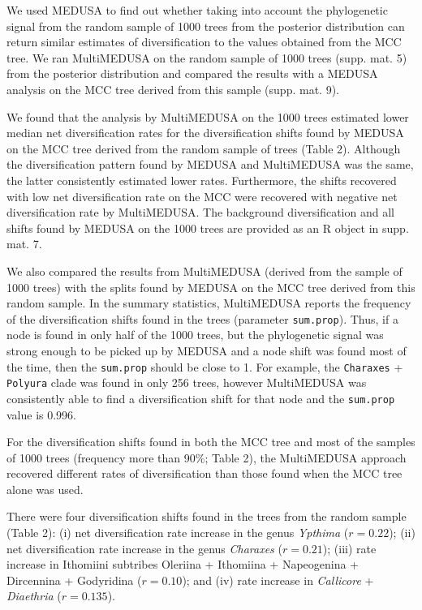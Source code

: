 \documentclass[10pt]{article}
\begin{document}
We used MEDUSA to find out whether taking into account the phylogenetic
signal from the random sample of 1000 trees from the posterior
distribution can return similar estimates of diversification to the
values obtained from the MCC tree. We ran MultiMEDUSA on the random
sample of 1000 trees (supp. mat. 5) from the posterior distribution and
compared the results with a MEDUSA analysis on the MCC tree derived from
this sample (supp. mat. 9).

We found that the analysis by MultiMEDUSA on the 1000 trees estimated
lower median net diversification rates for the diversification shifts
found by MEDUSA on the MCC tree derived from the random sample of trees
(Table 2). Although the diversification pattern found by MEDUSA and
MultiMEDUSA was the same, the latter consistently estimated lower rates.
Furthermore, the shifts recovered with low net diversification rate on
the MCC were recovered with negative net diversification rate by
MultiMEDUSA. The background diversification and all shifts found by
MEDUSA on the 1000 trees are provided as an R object in supp. mat. 7.

We also compared the results from MultiMEDUSA (derived from the sample
of 1000 trees) with the splits found by MEDUSA on the MCC tree derived
from this random sample. In the summary statistics, MultiMEDUSA reports
the frequency of the diversification shifts found in the trees
(parameter \texttt{sum.prop}). Thus, if a node is found in only half of
the 1000 trees, but the phylogenetic signal was strong enough to be
picked up by MEDUSA and a node shift was found most of the time, then
the \texttt{sum.prop} should be close to 1. For example, the
\texttt{Charaxes} + \texttt{Polyura} clade was found in only 256 trees,
however MultiMEDUSA was consistently able to find a diversification
shift for that node and the \texttt{sum.prop} value is 0.996.

For the diversification shifts found in both the MCC tree and most of
the samples of 1000 trees (frequency more than 90\%; Table 2), the
MultiMEDUSA approach recovered different rates of diversification than
those found when the MCC tree alone was used.

There were four diversification shifts found in the trees from the
random sample (Table 2): (i) net diversification rate increase in the
genus \emph{Ypthima} (\(r = 0.22\)); (ii) net diversification rate
increase in the genus \emph{Charaxes} (\(r = 0.21\)); (iii) rate
increase in Ithomiini subtribes Oleriina + Ithomiina + Napeogenina +
Dircennina + Godyridina (\(r = 0.10\)); and (iv) rate increase in
\emph{Callicore} + \emph{Diaethria} (\(r = 0.135\)).
\end{document}
